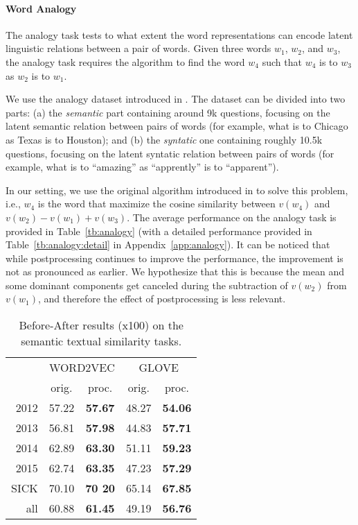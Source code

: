 \documentclass{article} \usepackage{acl2017,times}
\begin{document}
\paragraph{Word Analogy}

The analogy task  tests to what extent the word representations can encode  latent linguistic relations between a pair of words. Given three words $w_1$, $w_2$, and $w_3$, the analogy task requires the algorithm to find the word $w_4$ such that $w_4$ is to $w_3$ as $w_2$ is to $w_1$. 

We use the analogy dataset introduced in \citep{mikolov2013efficient}. The dataset can be divided into two parts: (a) the {\em semantic} part containing around 9k questions, focusing on  the latent semantic relation between pairs of words (for example, what is to {\rm Chicago} as {\rm Texas} is to {\rm Houston}); and (b) the {\em syntatic}  one containing roughly 10.5k questions, focusing on the latent syntatic relation between pairs of words (for example, what is to ``amazing'' as ``apprently'' is to ``apparent''). 

In our setting, we use the original algorithm introduced in \citep{mikolov2013efficient} to solve this problem, i.e., $w_4$ is the word that maximize the cosine similarity between $v(w_4)$ and $v(w_2) - v(w_1) + v(w_3)$. 
The average performance on the analogy task is provided in Table~\ref{tb:analogy} (with a detailed performance provided in Table~\ref{tb:analogy:detail} in Appendix~\ref{app:analogy}). It can be noticed that while postprocessing continues to improve the performance, the improvement is not as pronounced as earlier. We hypothesize that this is because the mean and some dominant components get canceled  during  the subtraction of $v(w_2)$ from $v(w_1)$, and therefore the effect of postprocessing is less relevant.



\begin{wraptable}{l}{0.45\textwidth}
\vspace{-10pt}
\begin{tabular}{|r||c|c||c|c|}
\hline
\multirow{2}{*}{} & \multicolumn{2}{c||}{WORD2VEC} & \multicolumn{2}{c|}{GLOVE} \\ \cline{2-5} 
                  & orig.      & proc.     & orig.    & proc.    \\ \hline
2012 &     57.22 &      \bf 57.67 &  48.27   &  \bf 54.06    \\ \hline
2013 &     56.81 &      \bf 57.98 &  44.83   & \bf 57.71     \\ \hline
2014 &     62.89 &      \bf 63.30 &   51.11  &  \bf 59.23    \\ \hline
2015 &     62.74 &      \bf 63.35&   47.23   &  \bf 57.29     \\ \hline
SICK &     70.10 &      \bf 70
20 &  65.14   &  \bf 67.85    \\ \hline
all  &     60.88 &      \bf 61.45 &  49.19   &    \bf 56.76  \\ \hline
\end{tabular}
\caption{Before-After results (x100) on the semantic textual similarity tasks.}
\label{tb:sts}
\end{wraptable}
\end{document}

